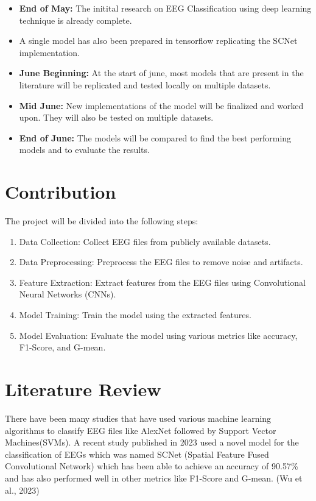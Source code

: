 \documentclass[11pt]{article}
\begin{document}
\begin{itemize}
    \item \textbf{End of May:} The initital research on EEG Classification using deep learning technique is already complete.
    \item A single model has also been prepared in tensorflow replicating the SCNet implementation.
    \item \textbf{June Beginning:} At the start of june, most models that are present in the literature will be replicated and tested locally on multiple datasets.
    \item \textbf{Mid June:} New implementations of the model will be finalized and worked upon. They will also be tested on multiple datasets.
    \item \textbf{End of June:} The models will be compared to find the best performing models and to evaluate the results.
\end{itemize}

\section{Contribution}












The project will be divided into the following steps:
\begin{enumerate}
    \item Data Collection: Collect EEG files from publicly available datasets.
    \item Data Preprocessing: Preprocess the EEG files to remove noise and artifacts.
    \item Feature Extraction: Extract features from the EEG files using Convolutional Neural Networks (CNNs).
    \item Model Training: Train the model using the extracted features.
    \item Model Evaluation: Evaluate the model using various metrics like accuracy, F1-Score, and G-mean.
\end{enumerate}

\section{Literature Review}
There have been many studies that have used various machine learning algorithms to classify EEG files like AlexNet followed by Support Vector Machines(SVMs). A recent study published in 2023 used a novel model for the classification of EEGs which was named SCNet (Spatial Feature Fused Convolutional Network) which has been able to achieve an accuracy of 90.57\% and has also performed well in other metrics like F1-Score and G-mean. (Wu et al., 2023)
\end{document}
